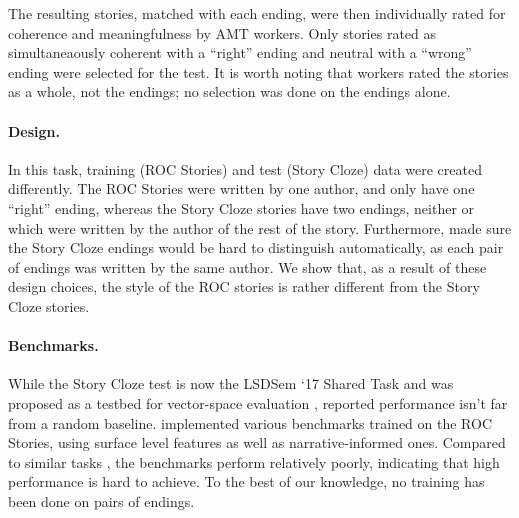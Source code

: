 \documentclass[11pt,a4paper]{article}
\begin{document}
The resulting stories, matched with each ending, were then individually rated for coherence and meaningfulness by AMT workers. Only stories rated as simultaneaously coherent with a ``right'' ending and neutral with a ``wrong'' ending were selected for the test. It is worth noting that workers rated the stories as a whole, not the endings; no selection was done on the endings alone.

\paragraph{Design.}
In this task, training (ROC Stories) and test (Story Cloze) data were created differently.
The ROC Stories were written by one author, and only have one ``right'' ending, whereas the Story Cloze stories have two endings, neither or which were written by the author of the rest of the story. Furthermore, \citet{Mostafazadeh:2016} made sure the Story Cloze endings would be hard to distinguish automatically, as each pair of endings was written by the same author. We show that, as a result of these design choices, the style of the ROC stories is rather different from the Story Cloze stories.

\paragraph{Benchmarks.} While the Story Cloze test is now the LSDSem `17 Shared Task and was proposed as a testbed for vector-space evaluation \cite{mostafazadeh2016story}, reported performance isn't far from a random baseline. \citet{Mostafazadeh:2016} implemented various benchmarks trained on the ROC Stories, using surface level features as well as narrative-informed ones. Compared to similar tasks \cite{hermann2015teaching,rajpurkar2016squad,bowman2015large}, the benchmarks perform relatively poorly, indicating that high performance is hard to achieve.
To the best of our knowledge, no training has been done on pairs of endings.
\end{document}
